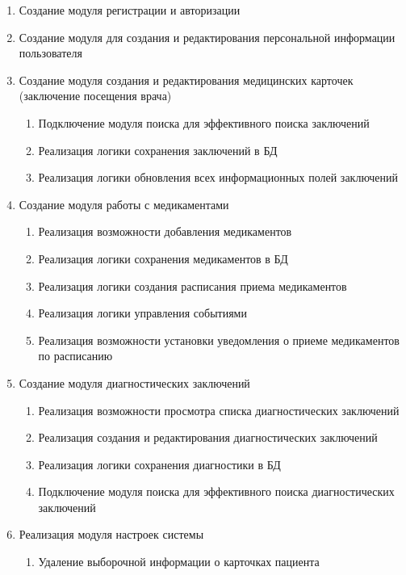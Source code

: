 \begin{enumerate}
\item Создание модуля регистрации и авторизации
\item Создание модуля для создания и редактирования персональной информации пользователя
\item Создание модуля создания и редактирования медицинских карточек (заключение посещения врача)
\begin{enumerate}
\item Подключение модуля поиска для эффективного поиска заключений
\item Реализация логики сохранения заключений в БД
\item Реализация логики обновления всех информационных полей заключений
\end{enumerate}
\item Создание модуля работы с медикаментами
\begin{enumerate}
\item Реализация возможности добавления медикаментов
\item Реализация логики сохранения медикаментов в БД
\item Реализация логики создания расписания приема медикаментов
\item Реализация логики управления событиями
\item Реализация возможности установки уведомления о приеме медикаментов по расписанию
\end{enumerate}
\item Создание модуля диагностических заключений
\begin{enumerate}
\item Реализация возможности просмотра списка диагностических заключений
\item Реализация создания и редактирования диагностических заключений
\item Реализация логики сохранения диагностики в БД
\item Подключение модуля поиска для эффективного поиска диагностических заключений
\end{enumerate}
\item Реализация модуля настроек системы
\begin{enumerate}
\item Удаление выборочной информации о карточках пациента
\end{enumerate}
\end{enumerate}
